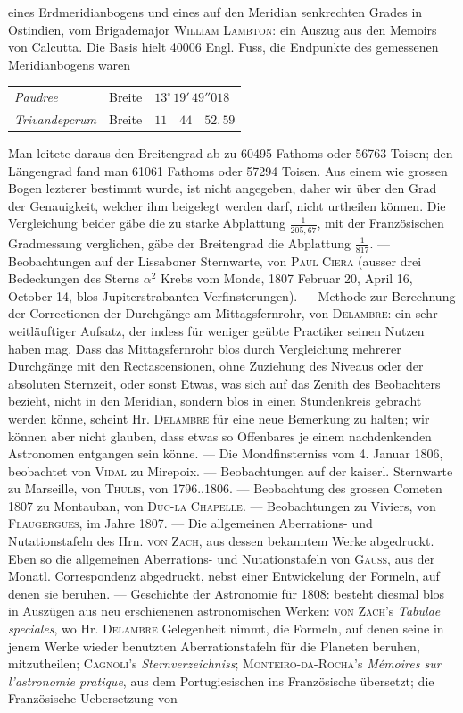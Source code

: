 eines Erdmeridianbogens und eines auf den Meridian senkrechten Grades in Ostindien, vom Brigademajor \textsc{William Lambton}: ein Auszug aus den Memoirs von Calcutta. Die Basis hielt 40006 Engl. Fuss, die Endpunkte des gemessenen Meridianbogens waren

\begin{center}\begin{tabular}{@{}lll@{}}\emph{Paudree} & Breite & $13^\circ\,19'\,49''018$ \\ \emph{Trivandepcrum} & Breite & $11\quad44\quad52.\,59$ \\ \end{tabular}\end{center}
\noindent Man leitete daraus den Breitengrad ab zu 60495 Fathoms oder 56763 Toisen; den Längengrad fand man 61061 Fathoms oder 57294 Toisen. Aus einem wie grossen Bogen lezterer bestimmt wurde, ist nicht angegeben, daher wir über den Grad der Genauigkeit, welcher ihm beigelegt werden darf, nicht urtheilen können. Die Vergleichung beider gäbe die zu starke Abplattung $\frac{1}{205,67}$, mit der Französischen Gradmessung verglichen, gäbe der Breitengrad die Abplattung $\frac{1}{817}$. — Beobachtungen auf der Lissaboner Sternwarte, von \textsc{Paul Ciera} (ausser drei Bedeckungen des Sterns $\alpha^2$ Krebs vom Monde, 1807 Februar 20, April 16, October 14, blos Jupiterstrabanten-Verfinsterungen). — Methode zur Berechnung der Correctionen der Durchgänge am Mittagsfernrohr, von \textsc{Delambre}: ein sehr weitläuftiger Aufsatz, der indess für weniger geübte Practiker seinen Nutzen haben mag. Dass das Mittagsfernrohr blos durch Vergleichung mehrerer Durchgänge mit den Rectascensionen, ohne Zuziehung des Niveaus oder der absoluten Sternzeit, oder sonst Etwas, was sich auf das Zenith des Beobachters bezieht, nicht in den Meridian, sondern blos in einen Stundenkreis gebracht werden könne, scheint Hr. \textsc{Delambre} für eine neue Bemerkung zu halten; wir können aber nicht glauben, dass etwas so Offenbares je einem nachdenkenden Astronomen entgangen sein könne. — Die Mondfinsterniss vom 4. Januar 1806, beobachtet von \textsc{Vidal} zu Mirepoix. — Beobachtungen auf der kaiserl. Sternwarte zu Marseille, von \textsc{Thulis}, von 1796..1806. — Beobachtung des grossen Cometen 1807 zu Montauban, von \textsc{Duc-la Chapelle}. — Beobachtungen zu Viviers, von \textsc{Flaugergues}, im Jahre 1807. — Die allgemeinen Aberrations- und Nutationstafeln des Hrn. \textsc{von Zach}, aus dessen bekanntem Werke abgedruckt. Eben so die allgemeinen Aberrations- und Nutationstafeln von \textsc{Gauss}, aus der Monatl. Correspondenz abgedruckt, nebst einer Entwickelung der Formeln, auf denen sie beruhen. — Geschichte der Astronomie für 1808: besteht diesmal blos in Auszügen aus neu erschienenen astronomischen Werken: \textsc{von Zach}'s \emph{Tabulae speciales}, wo Hr. \textsc{Delambre} Gelegenheit nimmt, die Formeln, auf denen seine in jenem Werke wieder benutzten Aberrationstafeln für die Planeten beruhen, mitzutheilen; \textsc{Cagnoli}'s \emph{Sternverzeichniss}; \textsc{Monteiro-da-Rocha}'s \emph{Mémoires sur l'astronomie pratique}, aus dem Portugiesischen ins Französische übersetzt; die Französische Uebersetzung von 